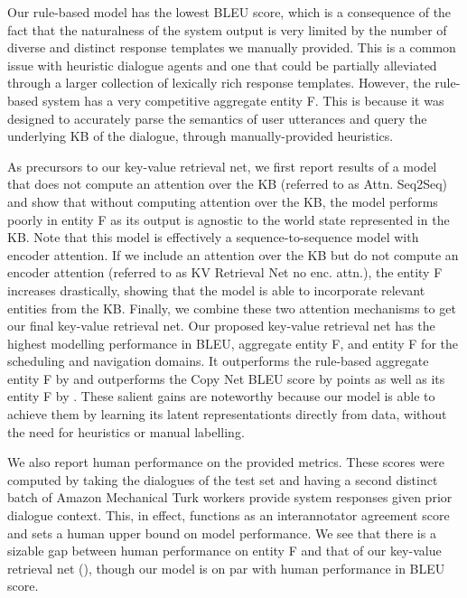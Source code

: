 \documentclass[11pt,a4paper]{article}
\begin{document}
Our rule-based model has the lowest BLEU score, which is a consequence of the fact that the naturalness of the system output is very limited by the number of diverse and distinct response templates we manually provided. This is a common issue with heuristic dialogue agents and one that could be partially alleviated through a larger collection of lexically rich response templates. However, the rule-based system has a very competitive aggregate entity F. This is because it was designed to accurately parse the semantics of user utterances and query the underlying KB of the dialogue, through manually-provided heuristics. 

 As precursors to our key-value retrieval net, we first report results of a model that does not compute an attention over the KB (referred to as Attn. Seq2Seq) and show that without computing attention over the KB, the model performs poorly in entity F as its output is agnostic to the world state represented in the KB. Note that this model is effectively a sequence-to-sequence model with encoder attention. If we include an attention over the KB but do not compute an encoder attention (referred to as KV Retrieval Net no enc. attn.), the entity F increases drastically, showing that the model is able to incorporate relevant entities from the KB. Finally, we combine these two attention mechanisms to get our final key-value retrieval net. Our proposed key-value retrieval net has the highest modelling performance in BLEU, aggregate entity F, and entity F for the scheduling and navigation domains. It outperforms the rule-based aggregate entity F by  and outperforms the Copy Net BLEU score by  points as well as its entity F by . These salient gains are noteworthy because our model is able to achieve them by learning its latent representationts directly from data, without the need for heuristics or manual labelling.


We also report human performance on the provided metrics. These scores were computed by taking the dialogues of the test set and having a second distinct batch of Amazon Mechanical Turk workers provide system responses given prior dialogue context. This, in effect, functions as an interannotator agreement score and sets a human upper bound on model performance. We see that there is a sizable gap between human performance on entity F and that of our key-value retrieval net (), though our model is on par with human performance in BLEU score. 
\end{document}
